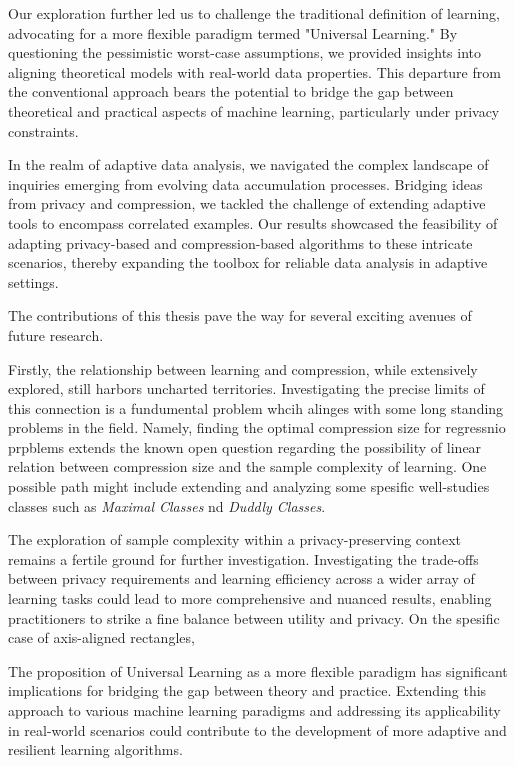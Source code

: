 Our exploration further led us to challenge the traditional definition of learning, advocating for a more flexible paradigm termed "Universal Learning." By questioning the pessimistic worst-case assumptions, we provided insights into aligning theoretical models with real-world data properties. This departure from the conventional approach bears the potential to bridge the gap between theoretical and practical aspects of machine learning, particularly under privacy constraints.

In the realm of adaptive data analysis, we navigated the complex landscape of inquiries emerging from evolving data accumulation processes. Bridging ideas from privacy and compression, we tackled the challenge of extending adaptive tools to encompass correlated examples. Our results showcased the feasibility of adapting privacy-based and compression-based algorithms to these intricate scenarios, thereby expanding the toolbox for reliable data analysis in adaptive settings.

\label{sec:conclusion:future}

The contributions of this thesis pave the way for several exciting avenues of future research.

Firstly, the relationship between learning and compression, while extensively explored, still harbors uncharted territories. Investigating the precise limits of this connection is a fundumental problem whcih alinges with some long standing problems in the field. Namely, finding the optimal compression size for regressnio prpblems extends the known open question regarding the possibility of linear relation between compression size and the sample complexity of learning. One possible path might include extending and analyzing some spesific well-studies classes such as \emph{Maximal Classes} nd \emph{Duddly Classes}.

The exploration of sample complexity within a privacy-preserving context remains a fertile ground for further investigation. Investigating the trade-offs between privacy requirements and learning efficiency across a wider array of learning tasks could lead to more comprehensive and nuanced results, enabling practitioners to strike a fine balance between utility and privacy. On the spesific case of axis-aligned rectangles, 

The proposition of Universal Learning as a more flexible paradigm has significant implications for bridging the gap between theory and practice. Extending this approach to various machine learning paradigms and addressing its applicability in real-world scenarios could contribute to the development of more adaptive and resilient learning algorithms.


